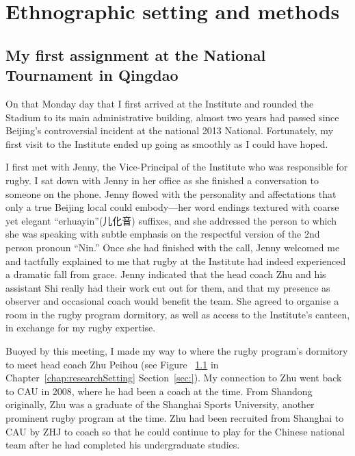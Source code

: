 

\begin{savequote}[8cm]

  \qauthor{}
\end{savequote}


\chapter{\label{chap:ethnoSetting} Ethnographic setting and methods}

  \minitoc



                                        \begin{CJK}{UTF8}{gbsn}

\section{My first assignment at the National Tournament in Qingdao \label{sect:qingdaoVignette}}

On that Monday day that I first arrived at the Institute and rounded the Stadium to its main administrative building, almost two years had passed since Beijing's controversial incident at the national 2013 National.  Fortunately, my first visit to the Institute ended up going as smoothly as I could have hoped.

I first met with Jenny, the Vice-Principal of the Institute who was responsible for rugby.  I sat down with Jenny in her office as she finished a conversation to someone on the phone. Jenny flowed with the personality and affectations that only a true Beijing local could embody---her word endings textured with coarse yet elegant ``erhuayin''(儿化音) suffixes, and she addressed the person to which she was speaking with subtle emphasis on the respectful version of the 2nd person pronoun ``Nin.''  Once she had finished with the call, Jenny welcomed me and tactfully explained to me that rugby at the Institute had indeed experienced a dramatic fall from grace.  Jenny indicated that the head coach Zhu and his assistant Shi really had their work cut out for them, and that my presence as observer and occasional coach would benefit the team.  She agreed to organise a room in the rugby program dormitory, as well as access to the Institute's canteen, in exchange for my rugby expertise.

Buoyed by this meeting, I made my way to where the rugby program's dormitory to meet head coach Zhu Peihou (see Figure ~\ref{} in Chapter~\ref{chap:researchSetting} Section~\ref{sec:}).  My connection to Zhu went back to CAU in 2008, where he had been a coach at the time.  From Shandong originally, Zhu was a graduate of the Shanghai Sports University, another prominent rugby program at the time.  Zhu had been recruited from Shanghai to CAU by ZHJ to coach so that he could continue to play for the Chinese national team after he had completed his undergraduate studies.


\end{CJK}

